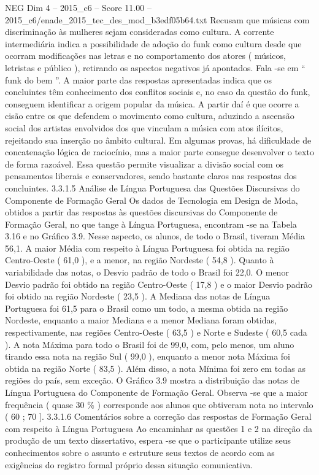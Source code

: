 \begin{textsample}{NEG Dim 4 – 2015\_c6 – Score 11.00 – 2015\_c6/enade\_2015\_tec\_des\_mod\_b3edf05b64.txt}
Recusam que músicas com discriminação às mulheres sejam consideradas como cultura.
A corrente intermediária indica a possibilidade de adoção do funk como cultura desde que ocorram modificações nas letras e no comportamento dos atores ( músicos, letristas e público ), retirando os aspectos negativos já apontados.
Fala -se em “ funk do bem ”.
A maior parte das respostas apresentadas indica que os concluintes têm conhecimento dos conflitos sociais e, no caso da questão do funk, conseguem identificar a origem popular da música.
A partir daí é que ocorre a cisão entre os que defendem o movimento como cultura, aduzindo a ascensão social dos artistas envolvidos dos que vinculam a música com atos ilícitos, rejeitando sua inserção no âmbito cultural.
Em algumas provas, há dificuldade de concatenação lógica de raciocínio, mas a maior parte consegue desenvolver o texto de forma razoável.
Essa questão permite visualizar a divisão social com os pensamentos liberais e conservadores, sendo bastante claros nas respostas dos concluintes. 3.3.1.5 Análise de Língua Portuguesa das Questões Discursivas do Componente de Formação Geral Os dados de Tecnologia em Design de Moda, obtidos a partir das respostas às questões discursivas do Componente de Formação Geral, no que tange à Língua Portuguesa, encontram -se na Tabela 3.16 e no Gráfico 3.9.
Nesse aspecto, os alunos, de todo o Brasil, tiveram Média 56,1.
A maior Média com respeito à Língua Portuguesa foi obtida na região Centro-Oeste ( 61,0 ), e a menor, na região Nordeste ( 54,8 ).
Quanto à variabilidade das notas, o Desvio padrão de todo o Brasil foi 22,0.
O menor Desvio padrão foi obtido na região Centro-Oeste ( 17,8 ) e o maior Desvio padrão foi obtido na região Nordeste ( 23,5 ).
A Mediana das notas de Língua Portuguesa foi 61,5 para o Brasil como um todo, a mesma obtida na região Nordeste, enquanto a maior Mediana e a menor Mediana foram obtidas, respectivamente, nas regiões Centro-Oeste ( 63,5 ) e Norte e Sudeste ( 60,5 cada ).
A nota Máxima para todo o Brasil foi de 99,0, com, pelo menos, um aluno tirando essa nota na região Sul ( 99,0 ), enquanto a menor nota Máxima foi obtida na região Norte ( 83,5 ).
Além disso, a nota Mínima foi zero em todas as regiões do país, sem exceção.
O Gráfico 3.9 mostra a distribuição das notas de Língua Portuguesa do Componente de Formação Geral.
Observa -se que a maior frequência ( quase 30 \% ) corresponde aos alunos que obtiveram nota no intervalo ( 60 ; 70 ]. 3.3.1.6 Comentários sobre a correção das respostas de Formação Geral com respeito à Língua Portuguesa Ao encaminhar as questões 1 e 2 na direção da produção de um texto dissertativo, espera -se que o participante utilize seus conhecimentos sobre o assunto e estruture seus textos de acordo com as exigências do registro formal próprio dessa situação comunicativa.

\end{textsample}
